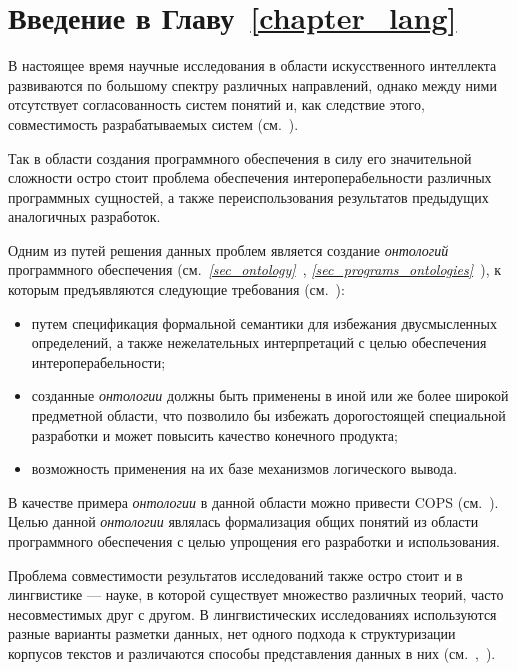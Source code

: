 \section*{Введение в Главу~\ref{chapter_lang}}

В настоящее время научные исследования в области искусственного интеллекта развиваются по большому спектру различных направлений, однако между ними отсутствует согласованность систем понятий и, как следствие этого, совместимость разрабатываемых систем (см.~).

Так в области создания программного обеспечения в силу его значительной сложности остро стоит проблема обеспечения интероперабельности различных программных сущностей, а также переиспользования результатов предыдущих аналогичных разработок.

Одним из путей решения данных проблем является создание \textit{онтологий} программного обеспечения (см.~\textit{\ref{sec_ontology}~}, \textit{\ref{sec_programs_ontologies}~}), к которым предъявляются следующие требования (см.~):
\begin{itemize}
    \item путем спецификация формальной семантики для избежания двусмысленных определений, а также нежелательных интерпретаций с целью обеспечения интероперабельности;
    \item созданные \textit{онтологии} должны быть применены в иной или же более широкой предметной области, что позволило бы избежать дорогостоящей специальной разработки и может повысить качество конечного продукта;
    \item возможность применения на их базе механизмов логического вывода.
\end{itemize}

В качестве примера \textit{онтологии} в данной области можно привести COPS (см.~).
Целью данной \textit{онтологии} являлась формализация общих понятий из области программного обеспечения с целью упрощения его разработки и использования.

Проблема совместимости результатов исследований также остро стоит и в лингвистике --- науке, в которой существует множество различных теорий, часто несовместимых друг с другом.
В лингвистических исследованиях используются разные варианты разметки данных, нет одного подхода к структуризации корпусов текстов и различаются способы представления данных в них (см.~,~).

